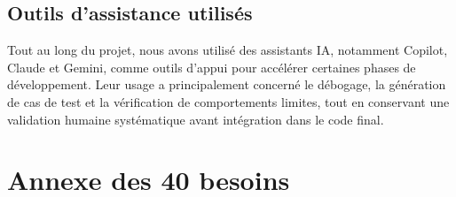 \documentclass[a4paper]{article}
\begin{document}
    \subsection{Outils d'assistance utilisés}
    Tout au long du projet, nous avons utilisé des assistants IA, notamment Copilot, Claude et Gemini, comme outils d'appui pour accélérer certaines phases de développement. Leur usage a principalement concerné le débogage, la génération de cas de test et la vérification de comportements limites, tout en conservant une validation humaine systématique avant intégration dans le code final.


\nocite{*}



\clearpage
\appendix

\section{Annexe des 40 besoins}
\end{document}
